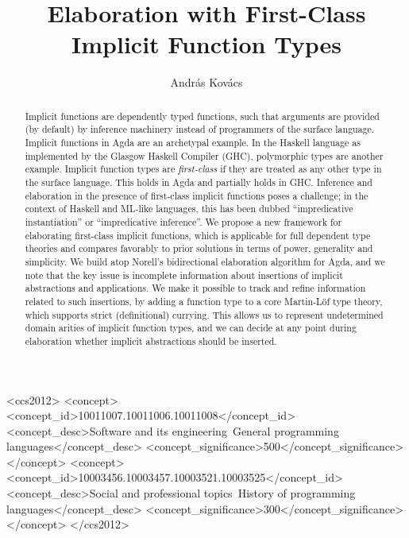 \documentclass[acmsmall,review,anonymous,prologue,dvipsnames]{acmart}\settopmatter{printfolios=true,printccs=false,printacmref=false}
\theoremstyle{remark}
\begin{document}
\title{Elaboration with First-Class Implicit Function Types}


\author{Andr{\'a}s Kov{\'a}cs}


\begin{abstract}
Implicit functions are dependently typed functions, such that arguments are
provided (by default) by inference machinery instead of programmers of the
surface language. Implicit functions in Agda are an archetypal example. In the
Haskell language as implemented by the Glasgow Haskell Compiler (GHC),
polymorphic types are another example. Implicit function types are
\emph{first-class} if they are treated as any other type in the surface
language. This holds in Agda and partially holds in GHC. Inference and
elaboration in the presence of first-class implicit functions poses a challenge;
in the context of Haskell and ML-like languages, this has been dubbed
``impredicative instantiation'' or ``impredicative inference''. We propose a new
framework for elaborating first-class implicit functions, which is applicable
for full dependent type theories and compares favorably to prior solutions in
terms of power, generality and simplicity. We build atop Norell's
bidirectional elaboration algorithm for Agda, and we note that the key issue is
incomplete information about insertions of implicit abstractions and
applications. We make it possible to track and refine information related to
such insertions, by adding a function type to a core Martin-L\"of type theory,
which supports strict (definitional) currying. This allows us to represent
undetermined domain arities of implicit function types, and we can decide at any
point during elaboration whether implicit abstractions should be inserted.
\end{abstract}


\begin{CCSXML}
<ccs2012>
<concept>
<concept_id>10011007.10011006.10011008</concept_id>
<concept_desc>Software and its engineering~General programming languages</concept_desc>
<concept_significance>500</concept_significance>
</concept>
<concept>
<concept_id>10003456.10003457.10003521.10003525</concept_id>
<concept_desc>Social and professional topics~History of programming languages</concept_desc>
<concept_significance>300</concept_significance>
</concept>
</ccs2012>
\end{CCSXML}
\end{document}
